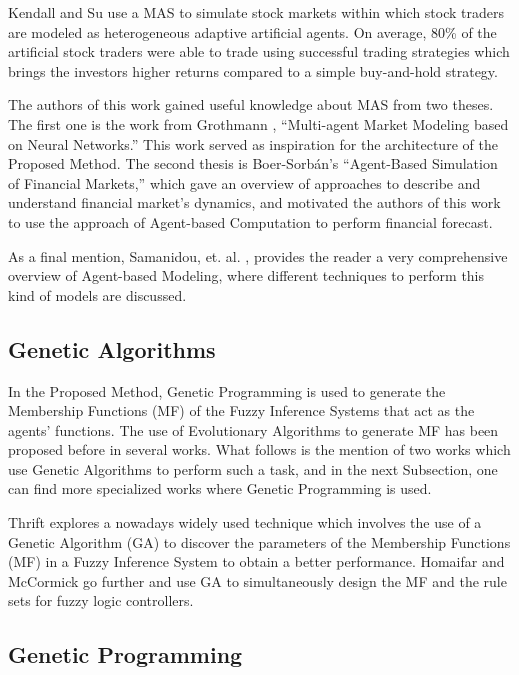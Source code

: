 \documentclass[12pt,journal,draftcls,onecolumn]{IEEEtran}
\begin{document}
Kendall and Su \cite{Kendall2003} use a MAS to simulate stock markets within which stock traders are modeled as heterogeneous adaptive artificial agents. On average, 80\% of the artificial stock traders were able to trade using successful trading strategies which brings the investors higher returns compared to a simple buy-and-hold strategy.

The authors of this work gained useful knowledge about MAS from two theses. The first one is the work from Grothmann \cite{Grothmann2002}, ``Multi-agent Market Modeling based on Neural Networks.'' This work served as inspiration for the architecture of the Proposed Method. The second thesis is Boer-Sorb{\'{a}}n's ``Agent-Based Simulation of Financial Markets,'' which gave an overview of approaches to describe and understand financial market's dynamics, and motivated the authors of this work to use the approach of Agent-based Computation to perform financial forecast.

As a final mention, Samanidou, et. al. \cite{Samanidou_2007}, provides the reader a very comprehensive overview of Agent-based Modeling, where different techniques to perform this kind of models are discussed.

\subsection{Genetic Algorithms}
\label{genetic-algorithms}

In the Proposed Method, Genetic Programming is used to generate the Membership Functions (MF) of the Fuzzy Inference Systems that act as the agents' functions. The use of Evolutionary Algorithms to generate MF has been proposed before in several works. What follows is the mention of two works which use Genetic Algorithms to perform such a task, and in the next Subsection, one can find more specialized works where Genetic Programming is used.

Thrift \cite{Thrift1991} explores a nowadays widely used technique which involves the use of a Genetic Algorithm (GA) to discover the parameters of the Membership Functions (MF) in a Fuzzy Inference System to obtain a better performance. Homaifar and McCormick \cite{Homaifar1995} go further and use GA to simultaneously design the MF and the rule sets for fuzzy logic controllers.

\subsection{Genetic Programming}
\label{genetic-programming}
\end{document}
